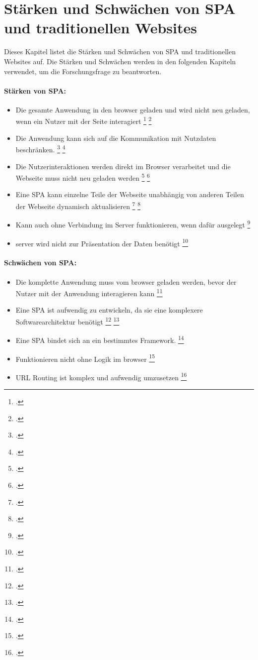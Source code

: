 \section{Stärken und Schwächen von \ac{SPA} und traditionellen Websites}
Dieses Kapitel listet die Stärken und Schwächen von \ac{SPA} und traditionellen Websites auf.
Die Stärken und Schwächen werden in den folgenden Kapiteln verwendet, um die Forschungsfrage zu beantworten.

\paragraph*{Stärken von \ac{SPA}:}
\begin{itemize}
    \item Die gesamte Anwendung in den \gls{browser} geladen und wird nicht neu geladen, wenn ein Nutzer mit der Seite interagiert \footcite[Vgl. ][Seite 3]{Smith2022} \footcite[Vgl.][Seite 7]{Flanagan2011}
    \item Die Anwendung kann sich auf die Kommunikation mit Nutzdaten beschränken. \footcite[Vgl. ][Seite 3]{Smith2022} \footcite[Vgl.][Seite 13]{Flanagan2011}
    \item Die Nutzerinteraktionen werden direkt im Browser verarbeitet und die Webseite muss nicht neu geladen werden \footcite[Vgl. ][Seite 3]{Smith2022} \footcite[Vgl.][Seite 12]{Flanagan2011}
    \item Eine \ac{SPA} kann einzelne Teile der Webseite unabhängig von anderen Teilen der Webseite dynamisch aktualisieren \footcite[Vgl. ][Seite 7]{Smith2022} \footcite[Vgl.][Seite 9]{Flanagan2011}
    \item Kann auch ohne Verbindung im Server funktionieren, wenn dafür ausgelegt \footcite[Vgl. ][Seite 7]{Smith2022}
    \item \gls{server} wird nicht zur Präsentation der Daten benötigt \footcite[Vgl. ][Seite 7]{Flanagan2011}
\end{itemize}


\paragraph*{Schwächen von \ac{SPA}:}

\begin{itemize}
    \item Die komplette Anwendung muss vom \gls{browser} geladen werden, bevor der Nutzer mit der Anwendung interagieren kann \footcite[Vgl. ][Seite 3]{Smith2022}
    \item Eine \ac{SPA} ist aufwendig zu entwickeln, da sie eine komplexere Softwarearchitektur benötigt \footcite[Vgl. ][Seite 4]{Smith2022} \footcite[Vgl.][Seite 15]{Flanagan2011}
    \item Eine \ac{SPA} bindet sich an ein bestimmtes Framework. \footcite[Vgl. ][Seite 4]{Smith2022}
    \item Funktionieren nicht ohne Logik im \gls{browser} \footcite[Vgl. ][Seite 7]{Smith2022}
    \item \ac{URL} Routing ist komplex und aufwendig umzusetzen \footcite[Vgl. ][Seite 7]{Smith2022}
\end{itemize}

